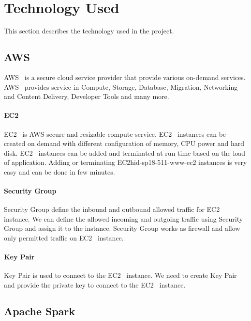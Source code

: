 \section{Technology Used}
This section describes the technology used in the project.

\subsection{AWS}

AWS~\cite{hid-sp18-511-www-aws} is a secure cloud service provider that provide various on-demand services. 
AWS~\cite{hid-sp18-511-www-aws} provides service in Compute, Storage, Database, Migration, Networking and Content Delivery, Developer Tools and many more.

\paragraph{EC2}

EC2~\cite{hid-sp18-511-www-ec2} is AWS secure and resizable compute service. EC2~\cite{hid-sp18-511-www-ec2} instances can be created on demand with different configuration of memory, CPU power and hard disk. EC2~\cite{hid-sp18-511-www-ec2} instances can be added and terminated at run time based on the load of application. Adding or terminating EC2{hid-sp18-511-www-ec2} instances is very easy and can be done in few minutes.

\paragraph{Security Group}

Security Group define the inbound and outbound allowed traffic for EC2~\cite{hid-sp18-511-www-ec2} instance.
We can define the allowed incoming and outgoing traffic using Security Group and assign it to the instance.
Security Group works as firewall and allow only permitted traffic on EC2~\cite{hid-sp18-511-www-ec2} instance.

\paragraph{Key Pair}

Key Pair is used to connect to the EC2~\cite{hid-sp18-511-www-ec2} instance. We need to create Key Pair and provide the private key to connect to the EC2~\cite{hid-sp18-511-www-ec2} instance.

\subsection{Apache Spark}

